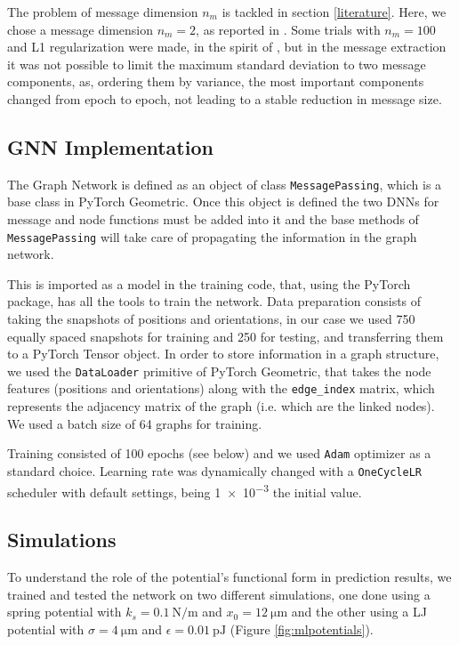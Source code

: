 \documentclass[../../master_thesis_np.tex]{subfiles}
\begin{document}
The problem of message dimension $n_m$ is tackled in section \ref{literature}. 
Here, we chose a message dimension $n_m = 2$, as reported in \cite{ruiz-garcia_discovering_2024}.
Some trials with $n_m = 100$ and L1 regularization were made, in the spirit of \cite{cranmer_discovering_2020}, but in the message extraction it was not possible to limit the maximum standard deviation to two message components, as, ordering them by variance, the most important components changed from epoch to epoch, not leading to a stable reduction in message size. 

\subsection{GNN Implementation}
The Graph Network is defined as an object of class \verb|MessagePassing|, which is a base class in PyTorch Geometric.
Once this object is defined the two DNNs for message and node functions must be added into it and the base methods of \verb|MessagePassing| will take care of propagating the information in the graph network.

This is imported as a model in the training code, that, using the PyTorch package, has all the tools to train the network.
Data preparation consists of taking the snapshots of positions and orientations, in our case we used 750 equally spaced snapshots for training and 250 for testing, and transferring them to a PyTorch Tensor object.
In order to store information in a graph structure, we used the \verb|DataLoader| primitive of PyTorch Geometric, that takes the node features (positions and orientations) along with the \verb|edge_index| matrix, which represents the adjacency matrix of the graph (i.e. which are the linked nodes).
We used a batch size of 64 graphs for training.

Training consisted of 100 epochs (see below) and we used \verb|Adam| optimizer as a standard choice.
Learning rate was dynamically changed with a \verb|OneCycleLR| scheduler with default settings, being \num{1e-3} the initial value.

\subsection{Simulations}
To understand the role of the potential's functional form in prediction results, we trained and tested the network on two different simulations, one done using a spring potential with $k_s = \SI{0.1}{\newton\per\meter}$ and $x_0 = \SI{12}{\um}$ and the other using a LJ potential with $\sigma = \SI{4}{\um}$ and $\epsilon = \SI{0.01}{\pico\joule}$ (Figure \ref{fig:mlpotentials}).
\end{document}
